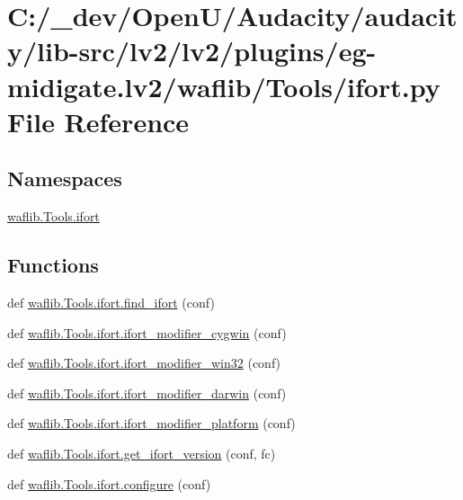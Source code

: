 \hypertarget{lv2_2plugins_2eg-midigate_8lv2_2waflib_2_tools_2ifort_8py}{}\section{C\+:/\+\_\+dev/\+Open\+U/\+Audacity/audacity/lib-\/src/lv2/lv2/plugins/eg-\/midigate.lv2/waflib/\+Tools/ifort.py File Reference}
\label{lv2_2plugins_2eg-midigate_8lv2_2waflib_2_tools_2ifort_8py}
\subsection*{Namespaces}
\begin{DoxyCompactItemize}
\item 
 \hyperlink{namespacewaflib_1_1_tools_1_1ifort}{waflib.\+Tools.\+ifort}
\end{DoxyCompactItemize}
\subsection*{Functions}
\begin{DoxyCompactItemize}
\item 
def \hyperlink{namespacewaflib_1_1_tools_1_1ifort_aa6838492a72ffb343c49d099cbbe1a25}{waflib.\+Tools.\+ifort.\+find\+\_\+ifort} (conf)
\item 
def \hyperlink{namespacewaflib_1_1_tools_1_1ifort_aa44d118aa83e088e0ab4e7ab47d662de}{waflib.\+Tools.\+ifort.\+ifort\+\_\+modifier\+\_\+cygwin} (conf)
\item 
def \hyperlink{namespacewaflib_1_1_tools_1_1ifort_a89fe1b18d4886bfeec97636459f81d35}{waflib.\+Tools.\+ifort.\+ifort\+\_\+modifier\+\_\+win32} (conf)
\item 
def \hyperlink{namespacewaflib_1_1_tools_1_1ifort_a3078d523f12c208147b3ee500f2cbd99}{waflib.\+Tools.\+ifort.\+ifort\+\_\+modifier\+\_\+darwin} (conf)
\item 
def \hyperlink{namespacewaflib_1_1_tools_1_1ifort_a468f9dd549fcae601c2733fae8e70e25}{waflib.\+Tools.\+ifort.\+ifort\+\_\+modifier\+\_\+platform} (conf)
\item 
def \hyperlink{namespacewaflib_1_1_tools_1_1ifort_afde0bb56d9602a855a6357c8021ace77}{waflib.\+Tools.\+ifort.\+get\+\_\+ifort\+\_\+version} (conf, fc)
\item 
def \hyperlink{namespacewaflib_1_1_tools_1_1ifort_a2eceee8c0f041a660b0759d18822b668}{waflib.\+Tools.\+ifort.\+configure} (conf)
\end{DoxyCompactItemize}
